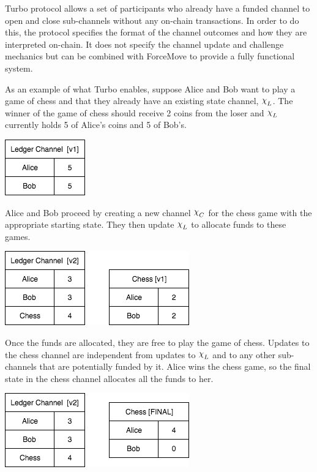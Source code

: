 \documentclass{article}
\DeclareRobustCommand{\rchi}{{\mathpalette\irchi\relax}}
\newcommand{\irchi}[2]{\raisebox{\depth}{$#1\chi$}} %
\theoremstyle{definition}
\begin{document}
Turbo protocol allows a set of participants who already have a funded channel to open and
close sub-channels without any on-chain transactions. 
In order to do this, the protocol specifies the format of the channel outcomes and how
they are interpreted on-chain.
It does not specify the channel update and challenge mechanics but can be combined with
ForceMove to provide a fully functional system.

As an example of what Turbo enables, suppose Alice and Bob want to play a game of chess and that
they already have an existing state channel, $\rchi_L$.
The winner of the game of chess should receive 2 coins from the loser and $\rchi_L$ currently holds
5 of Alice's coins and 5 of Bob's.

\begin{center}
  \includegraphics[scale=0.5]{turbo_start} %
\end{center}

Alice and Bob proceed by creating a new channel $\rchi_C$ for the chess game with the appropriate starting state.
They then update $\rchi_L$ to allocate funds to these games.

\begin{center}
  \includegraphics[scale=0.5]{turbo_open} %
\end{center}

Once the funds are allocated, they are free to play the game of chess.
Updates to the chess channel are independent from updates to $\rchi_L$ and to
any other sub-channels that are potentially funded by it. 
Alice wins the chess game, so the final state in the chess channel allocates all the
funds to her.

\begin{center}
  \includegraphics[scale=0.5]{turbo_close} %
\end{center}
\end{document}

